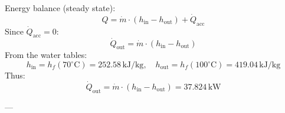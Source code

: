 Energy balance (steady state):  
\[
Q = \dot{m} \cdot (h_{\text{in}} - h_{\text{out}}) + \dot{Q}_{\text{acc}}
\]  
Since \(\dot{Q}_{\text{acc}} = 0\):  
\[
\dot{Q}_{\text{out}} = \dot{m} \cdot (h_{\text{in}} - h_{\text{out}})
\]  
From the water tables:  
\[
h_{\text{in}} = h_f(70^\circ\text{C}) = 252.58 \, \text{kJ/kg}, \quad h_{\text{out}} = h_f(100^\circ\text{C}) = 419.04 \, \text{kJ/kg}
\]  
Thus:  
\[
\dot{Q}_{\text{out}} = \dot{m} \cdot (h_{\text{in}} - h_{\text{out}}) = 37.824 \, \text{kW}
\]  

---